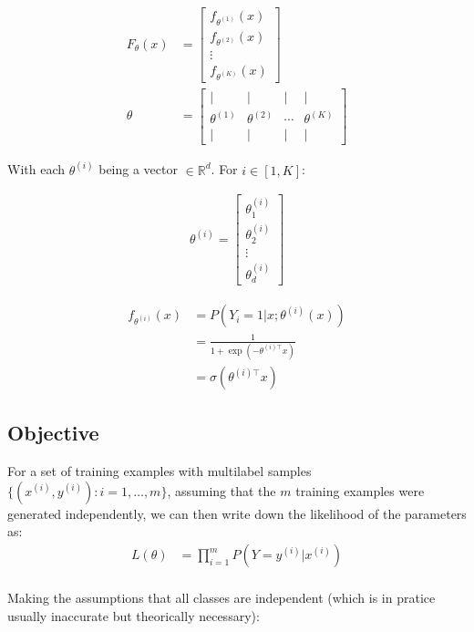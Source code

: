 \begin{align}
	F_\theta(x) 
		&= \begin{bmatrix} 
			f_{\theta^{(1)}}(x) \\ 
			f_{\theta^{(2)}}(x) \\ 
			\vdots \\ 
			f_{\theta^{(K)}}(x) 
		\end{bmatrix} \\
	\theta &= \left[\begin{array}{cccc}| & | & | & | \\ \theta^{(1)} & \theta^{(2)} & \cdots & \theta^{(K)} \\ | & | & | & | \end{array}\right]
\end{align}


With each $\theta^{(i)}$ being a vector $\in \mathbb{R}^{d}$.
For $i \in [1, K]$:

\begin{align}
	\theta^{(i)} = \left[
		\begin{array}{cccc}
			\theta_{1}^{(i)} \\
			\theta_{2}^{(i)} \\
			\vdots \\
			\theta_{d}^{(i)}
		\end{array}\right]
\end{align}


\begin{align}
	f_{\theta^{(i)}}(x) 
	&= P(Y_i = 1 | x; \theta^{(i)}(x)) \\
	&= \frac{1}{1 + \exp(-\theta^{(i)\top} x)}\\
	&= \sigma(\theta^{(i)\top} x)
\end{align}




\subsection{Objective}


For a set of training examples with multilabel samples $\{ (x^{(i)}, y^{(i)}) : i=1,\ldots,m\}$, assuming that the $m$ training examples were generated independently, we can then write down the likelihood of the parameters as:
\begin{align}
	L(\theta) &= \prod_{i=1}^m P(Y=y^{(i)} | x^{(i)} ) \\
\end{align}

Making the assumptions that all classes are independent (which is in pratice usually inaccurate but theorically necessary):

